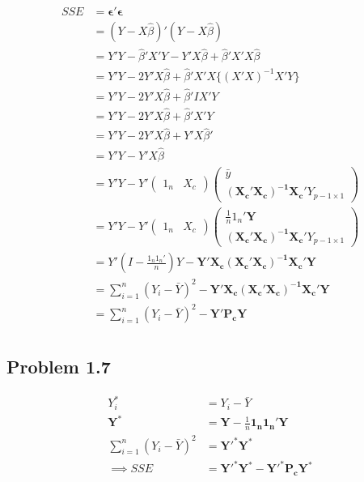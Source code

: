 \documentclass[a4paper]{article}
\begin{document}
\begin{align*}
SSE &= \mathbf{\epsilon'\epsilon}\\
&=(Y-X\hat{\beta})'(Y-X\hat{\beta})\\
&= Y'Y-\hat{\beta}'X'Y-Y'X\hat{\beta}+\hat{\beta}'X'X\hat{\beta}\\
&= Y'Y-2Y'X\hat{\beta} + \hat{\beta}'X'X\{(X'X)^{-1}X'Y\}\\
&= Y'Y-2Y'X\hat{\beta} + \hat{\beta}'IX'Y\\
&= Y'Y-2Y'X\hat{\beta} + \hat{\beta}'X'Y\\
&= Y'Y-2Y'X\hat{\beta} + Y'X\hat{\beta}'\\
&= Y'Y-Y'X\hat{\beta}\\
&= Y'Y-Y'\begin{pmatrix}
1_n & X_c
\end{pmatrix}\begin{pmatrix}
\bar{y}\\
\mathbf{(X_c'X_c)^{-1}X_c}'Y_{p-1\times 1}
\end{pmatrix}\\
&=Y'Y-Y'\begin{pmatrix}
1_n & X_c
\end{pmatrix}\begin{pmatrix}
\frac{1}{n}1_n'\mathbf{Y}\\
\mathbf{(X_c'X_c)^{-1}X_c}'Y_{p-1\times 1}
\end{pmatrix}\\ 
&= Y'(I-\frac{1_n1_n'}{n})Y - \mathbf{Y'X_c}\mathbf{(X_c'X_c)^{-1}X_c}'\mathbf{Y}\\
&=\sum_{i=1}^n(Y_i-\bar{Y})^2 -\mathbf{Y'X_c}\mathbf{(X_c'X_c)^{-1}X_c}'\mathbf{Y}\\
&=\sum_{i=1}^n(Y_i-\bar{Y})^2 -\mathbf{Y'P_c}\mathbf{Y}\\
\end{align*}

\subsection*{Problem 1.7}

\begin{align*}
Y_i^* &= Y_i-\bar{Y}\\
\mathbf{Y}^* &= \mathbf{Y}-\frac{1}{n}\mathbf{1_n1_n'Y}\\
\sum_{i=1}^n(Y_i-\bar{Y})^2 &= \mathbf{Y'}^{*}\mathbf{Y}^*\\
\implies SSE &= \mathbf{Y'}^{*}\mathbf{Y}^*-\mathbf{Y'^*P_c}\mathbf{Y^*}
\end{align*}
\end{document}
